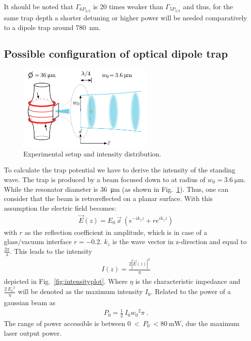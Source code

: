 It should be noted that \(\Gamma_{6P_{3/2}}\) is 20 times weaker than 
\(\Gamma_{5P_{3/2}}\) and thus, for the same trap depth a shorter detuning or 
higher power will be needed comparatively to a dipole trap around \SI{780}{\nano\meter}.

\subsection*{Possible configuration of optical dipole trap}
\begin{figure}[h]
    \centering
    \includegraphics[width=0.6\textwidth]{resonator_trap_label}
    \caption{\label{fig:resonator_trap_label} Experimental setup and intensity distribution. }
\end{figure}
To calculate the trap potential we have to derive the intensity of the standing
wave. The trap is produced by a beam focused down to at radius of \(w_0 = 
\SI{3.6}{\micro\meter} \). While the resonator diameter is \SI{36}{\micro\meter}
(as shown in Fig.~\ref{fig:resonator_trap_label}). Thus, one can consider that
the beam is retroreflected on a planar surface. With this assumption the electric 
field becomes:
\begin{align}
    \vec{E}(z) = E_0~\vec{x}~\left( e^{-i k_z z} + r e^{i k_z z} \right)
\end{align}
with \(r \) as the reflection coefficient in amplitude, which is in case of a 
glass/vacuum interface \(r = -0.2 \). \(k_z \) is the wave vector in z-direction 
and equal to \(\frac{2\pi}{\lambda} \). This leads to the intensity
\begin{align}
    I(z) = \frac{ { 2| \vec{E}(z) | }^2}{\eta}
\end{align}
depicted in Fig.~\ref{fig:intensityplot}. Where \(\eta \) is the characteristic 
impedance and \(\frac{2~{E_0}^2}{\eta} \) will be denoted as the maximum intensity 
\(I_0 \). Related to the power of a gaussian beam as
\begin{align}
    P_0 = \frac{1}{2}~I_0 {w_0}^2 \pi~.
\end{align} 
The range of power accessible is between \(0~<~P_0~<\SI{80}{\milli\watt} \), due
the maximum laser output power. 

